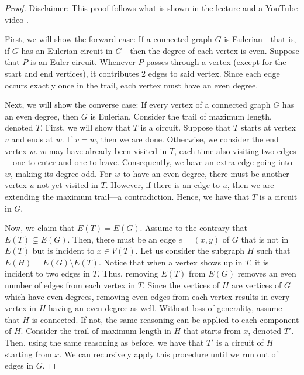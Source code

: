\begin{proof}
  Disclaimer: This proof follows what is shown in the lecture and a YouTube video \cite{euler-graph-prf}.

  First, we will show the forward case: If a connected graph \(G\) is Eulerian---that is, if \(G\) has an Eulerian circuit in \(G\)---then the degree of each vertex is even. Suppose that \(P\) is an Euler circuit. Whenever \(P\) passes through a vertex (except for the start and end vertices), it contributes 2 edges to said vertex. Since each edge occurs exactly once in the trail, each vertex must have an even degree.

  Next, we will show the converse case: If every vertex of a connected graph \(G\) has an even degree, then \(G\) is Eulerian. Consider the trail of maximum length, denoted \(T\). First, we will show that \(T\) is a circuit. Suppose that \(T\) starts at vertex \(v\) and ends at \(w\). If \(v = w\), then we are done. Otherwise, we consider the end vertex \(w\). \(w\) may have already been visited in \(T\), each time also visiting two edges---one to enter and one to leave. Consequently, we have an extra edge going into \(w\), making its degree odd. For \(w\) to have an even degree, there must be another vertex \(u\) not yet visited in \(T\). However, if there is an edge to \(u\), then we are extending the maximum trail---a contradiction. Hence, we have that \(T\) is a circuit in \(G\). 

  Now, we claim that \(E(T) = E(G)\). Assume to the contrary that \(E(T) \subsetneq E(G)\). Then, there must be an edge \(e = (x, y)\) of \(G\) that is not in \(E(T)\) but is incident to \(x \in V(T)\). Let us consider the subgraph \(H\) such that \(E(H) = E(G) \setminus E(T)\). Notice that when a vertex shows up in \(T\), it is incident to two edges in \(T\). Thus, removing \(E(T)\) from \(E(G)\) removes an even number of edges from each vertex in \(T\). Since the vertices of \(H\) are vertices of \(G\) which have even degrees, removing even edges from each vertex results in every vertex in \(H\) having an even degree as well. Without loss of generality, assume that \(H\) is connected. If not, the same reasoning can be applied to each component of \(H\). Consider the trail of maximum length in \(H\) that starts from \(x\), denoted \(T'\). Then, using the same reasoning as before, we have that \(T'\) is a circuit of \(H\) starting from \(x\). We can recursively apply this procedure until we run out of edges in \(G\). 


\end{proof}
